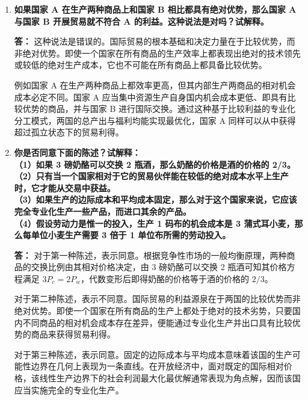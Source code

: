 \begin{enumerate}[label=\textbf{\arabic*.}, leftmargin=*]
		当两国之间存在产业结构、资源禀赋或技术水平的差异时，自由贸易引导每个国家根据自身相对成本更低的领域进行专业化分工。这种国际分工打破了单一国家内部资源存量的瓶颈约束，使两国的总体消费边界得以扩展到各自孤立状态下的生产可能性边界之外，从而令两国的消费者境况同时得到改善。
		
		\item \textbf{如果国家 A 在生产两种商品上和国家 B 相比都具有绝对优势，那么国家 A 与国家 B 开展贸易就不符合 A 的利益。这种说法是对吗？试解释。}
		
		\textbf{答：}
		这种说法是错误的。国际贸易的根本基础和决定力量在于比较优势，而非绝对优势。即使一个国家在所有商品的生产效率上都表现出绝对的技术领先或较低的绝对生产成本，它也不可能在所有商品上都具备比较优势。
		
		例如国家 A 在生产两种商品上都效率更高，但其内部生产两商品的相对机会成本必定不同。国家 A 应当集中资源生产自身国内机会成本更低、即具有比较优势的商品，并与国家 B 进行国际交换。通过这种基于比较利益的专业化分工模式，两国的总产出与福利均能实现最优化，国家 A 同样可以从中获得超过孤立状态下的贸易利得。
		
		\item \textbf{你是否同意下面的陈述？试解释：\\（1）如果 3 磅奶酪可以交换 2 瓶酒，那么奶酪的价格是酒的价格的 2/3。\\（2）只有当一个国家相对于它的贸易伙伴能在较低的绝对成本水平上生产时，它才能从交易中获益。\\（3）如果生产的边际成本和平均成本固定，那么对于这个国家来说，它应该完全专业化生产一些产品，而进口其余的产品。\\（4）假设劳动力是惟一的投入，生产 1 码布的机会成本是 3 蒲式耳小麦，那么每单位小麦生产需要 3 倍于 1 单位布所需的劳动投入。}
		
		\textbf{答：}
		对于第一种陈述，表示同意。根据竞争性市场的一般均衡原理，两种商品的交换比例由其相对价格决定，由 3 磅奶酪可以交换 2 瓶酒可知其价格方程满足 $3 P_c = 2 P_w$，代数变形后即得奶酪的价格等于酒的价格的 $2/3$。
		
		对于第二种陈述，表示不同意。国际贸易的利益源泉在于两国的比较优势而非绝对优势。即使一个国家在所有商品的生产上都处于绝对的技术劣势，只要国内不同商品的相对机会成本存在差异，便能通过专业化生产并出口具有比较优势的商品来获得贸易利得。
		
		对于第三种陈述，表示同意。固定的边际成本与平均成本意味着该国的生产可能性边界在几何上表现为一条直线。在开放经济中，面对既定的国际相对价格，该线性生产边界下的社会利润最大化最优解通常表现为角点解，因而该国应当实施完全的专业化生产。
		

\end{enumerate}
